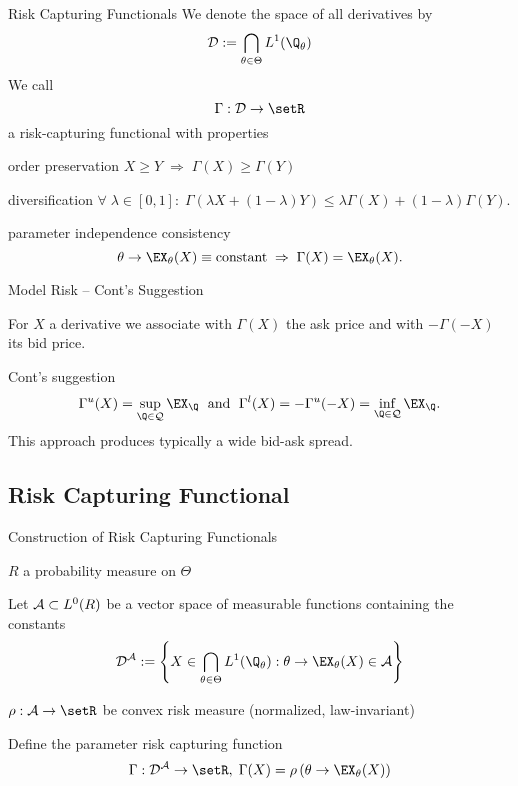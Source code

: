 {Risk Capturing Functionals}
We denote the space of all derivatives by
\begin{equation}
{\cal D} := \bigcap_{\theta \in \Theta} L^1(\Q_\theta)
\end{equation}
We call
$$
\Gamma: {\cal D} \rightarrow \setR
$$
a risk-capturing functional with properties
\item<1-> order preservation $X \geq Y \; \Rightarrow \; \Gamma(X) \geq \Gamma(Y)$
\item<2-> diversification $\forall \; \lambda \in [0,1]: \; \Gamma(\lambda X + (1-\lambda) Y) \leq \lambda \Gamma(X) + (1-\lambda) \Gamma(Y).$
\item<3-> parameter independence consistency
$$
\theta \rightarrow \EX_\theta(X) \equiv \mbox{constant} \; \Rightarrow \; \Gamma(X) = \EX_\theta(X).
$$

{Model Risk -- Cont's Suggestion}
\item<1-> For $X$ a derivative we associate with
$\Gamma(X)$ the ask price and with $-\Gamma(-X)$ its bid price.
\item<2-> Cont's suggestion
$$
\Gamma^u(X)=\sup_{\Q \in {\cal Q}} \EX_{\Q} \; \mbox{ and } \;
\Gamma^l(X)= -\Gamma^u(-X)=\inf_{\Q \in {\cal Q}} \EX_{\Q}.
$$
This approach produces typically a wide bid-ask spread.

\subsection{Risk Capturing Functional}

{Construction of Risk Capturing Functionals}
\item<1-> $R$ a probability measure on $\Theta$
\item<1-> Let ${\cal A} \subset L^0(R)$ be a vector space of measurable functions containing the constants
\begin{equation}
{\cal D^A} := \left\{ X \in \bigcap_{\theta \in \Theta}  L^1(\Q_\theta): \theta \rightarrow \EX_\theta(X) \in {\cal A} \right\}
\end{equation}
\item<1-> $\rho: {\cal A} \rightarrow \setR$ be convex risk measure (normalized, law-invariant)
\item<2->

Define the parameter risk capturing function
\begin{equation}
\Gamma: {\cal D^A} \rightarrow \setR, \; \Gamma(X) = \rho\left(\theta \rightarrow \EX_\theta(X)\right)
\end{equation}

